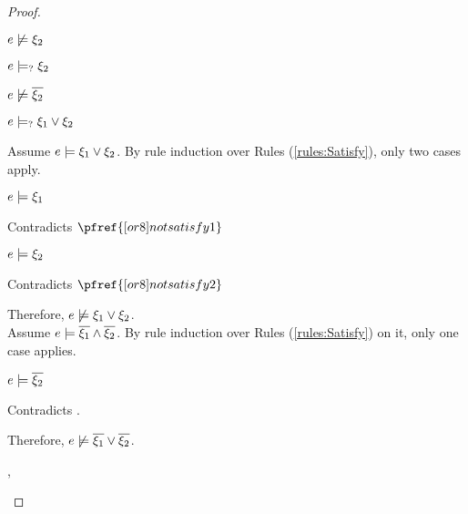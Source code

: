 \begin{proof}
\begin{byCases}
\begin{byCases}
\begin{pfsteps*}
        \item $e \not\models \xi_2$  
        \item $e \models_{?} \xi_2$  
        \item $e \not\models \overline{\xi_2}$  
        \item $e \models_{?} \xi_1 \vee \xi_2$  
        \end{pfsteps*}
        Assume $e \models \xi_1 \vee \xi_2$. By rule induction over Rules (\ref{rules:Satisfy}), only two cases apply.
        \begin{byCases}
        \item[\text{(\ref{rule:CSOr1})}]
            \begin{pfsteps*}
            \item $e \models \xi_1$ 
            \end{pfsteps*}
            Contradicts $\pfref{[or8]notsatisfy1}$
        \item[\text{(\ref{rule:CSOr2})}]
            \begin{pfsteps*}
            \item $e \models \xi_2$ 
            \end{pfsteps*}
            Contradicts $\pfref{[or8]notsatisfy2}$
        \end{byCases}
        Therefore, $e \not\models \xi_1 \vee \xi_2$.\\
        Assume $e \models \overline{\xi_1} \wedge \overline{\xi_2}$. By rule induction over Rules (\ref{rules:Satisfy}) on it, only one case applies.
        \begin{byCases}
        \item[\text{(\ref{rule:CSAnd})}]
            \begin{pfsteps*}
            \item $e \models \overline{\xi_2}$ 
            \end{pfsteps*}
            Contradicts .
        \end{byCases}
        Therefore, $e \not\models \overline{\xi_1} \vee \overline{\xi_2}$.
    \item[\csatisfy{e}{\cdual{\xi_1}},\csatisfy{e}{\cdual{\xi_2}}]

\end{byCases}
\end{byCases}
\end{proof}
